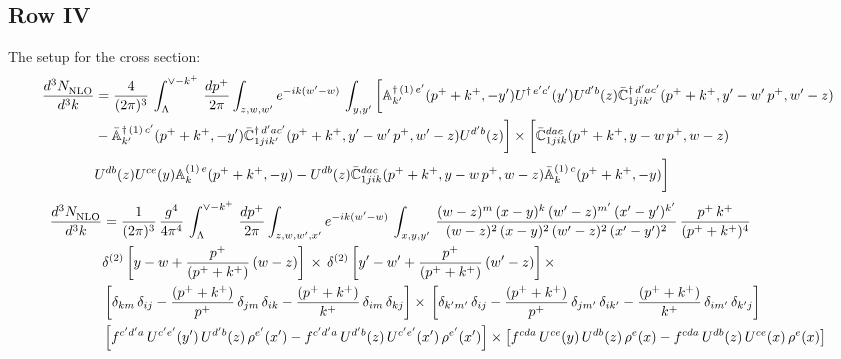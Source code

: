 \documentclass[9pt]{article}
\def\mf#1{\mathbb{#1}}
\numberwithin{equation}{section}
\begin{document}
\subsection{Row IV\,}
 The setup for the cross section: 
\begin{align}
    \frac{d^{3}N_{\rm NLO}^{\rm}}{d^{3}k}  & = \frac{4}{(2\pi)^{3}}\,\int_{\Lambda}^{\vee-k^{+}}\, \frac{dp^{+}}{2\pi}\int_{z,w,w^{\prime}} e^{-ik(w^{\prime}-w)}\,  \int_{y,y^{\prime}}\bigg[\mf{A}^{\dagger\, (1)\,e^{\prime}}_{k^{\prime}}(p^{+}+k^{+},-y^{\prime})U^{\dagger\, e^{\prime}c^{\prime}}(y^{\prime})U^{d^{\prime}b}(z) \Bar{\mf{C}}^{\dagger\, d^{\prime}ac^{\prime}}_{1jik^{\prime}}(p^{+}+k^{+},y^{\prime}-w^{\prime}\, p^{+},w^{\prime}-z) \notag \\ &  -\Bar{\mf{A}}^{\dagger\, (1)\,c^{\prime}}_{k^{\prime}}(p^{+}+k^{+},-y^{\prime}) \Bar{\mf{C}}^{\dagger\, d^{\prime}ac^{\prime}}_{1jik^{\prime}}(p^{+}+k^{+},y^{\prime}-w^{\prime}\, p^{+},w^{\prime}-z)U^{d^{\prime}b}(z)\bigg]\times\bigg[\Bar{\mf{C}}^{dac}_{1jik}(p^{+}+k^{+},y-w\, p^{+},w-z)\notag \\ & U^{db}(z)U^{ce}(y) \mf{A}^{(1)\,e}_{k}(p^{+}+k^{+},-y) -U^{db}(z) \Bar{\mf{C}}^{dac}_{1jik}(p^{+}+k^{+},y-w\, p^{+},w-z)\Bar{\mf{A}}^{(1)\,c}_{k}(p^{+}+k^{+},-y)\bigg]\nonumber
\end{align}
\begin{align}
     \frac{d^{3}N_{\rm NLO}^{\rm}}{d^{3}k}  & = \frac{1}{(2\pi)^{3}}\,\frac{g^{4}}{4\pi^{4}}\,\int_{\Lambda}^{\vee-k^{+}}\, \frac{dp^{+}}{2\pi}\int_{z,w,w^{\prime},x'} e^{-ik(w^{\prime}-w)}\,  \int_{x,y,y^{\prime}}\,\frac{(w-z)^{m}\,(x-y)^{k}\,(w'-z)^{m'}\,(x'-y')^{k'}}{(w-z)^{2}\,(x-y)^{2}\,(w'-z)^{2}\,(x'-y')^{2}}\,\frac{p^{+}\,k^{+}}{(p^{+}+k^{+})^{4}}\notag \\ & \delta^{(2)}\left[y-w+\frac{p^{+}}{(p^{+}+k^{+})}\,(w-z)\right]\,\times\, \delta^{(2)}\left[y'-w'+\frac{p^{+}}{(p^{+}+k^{+})}\,(w'-z)\right]\times\notag \\ &  \left[\delta_{km}\,\delta_{ij}-\frac{(p^{+}+k^{+})}{p^{+}}\,\delta_{jm}\,\delta_{ik}-\frac{(p^{+}+k^{+})}{k^{+}}\,\delta_{im}\,\delta_{kj}\right]\times\, \left[\delta_{k'm'}\,\delta_{ij}-\frac{(p^{+}+k^{+})}{p^{+}}\,\delta_{jm'}\,\delta_{ik'}-\frac{(p^{+}+k^{+})}{k^{+}}\,\delta_{im'}\,\delta_{k'j}\right]\notag \\ & \left[f^{c'd'a}\,U^{c'e'}(y')\,U^{d'b}(z)\,\rho^{e'}(x')-f^{c'd'a}\, 
    U^{d'b}(z)\,U^{c'e'}(x')\,\rho^{e'}(x')\right]\times \left[f^{cda}\,U^{ce}(y)\,U^{db}(z)\,\rho^{e}(x)-f^{cda}\, 
    U^{db}(z)\,U^{ce}(x)\,\rho^{e}(x)\right]
\end{align}
\end{document}

